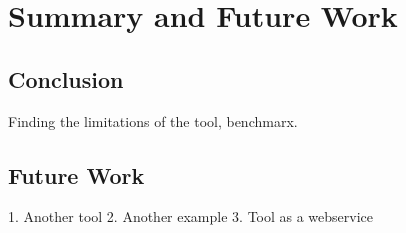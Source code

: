 \section{Summary and Future Work}\label{sec:timeplan}
\subsection{Conclusion}\label{subsec:conclusion}
Finding the limitations of the tool, benchmarx.
\subsection{Future Work}\label{subsec:futurework}
1. Another tool
2. Another example
3. Tool as a webservice




